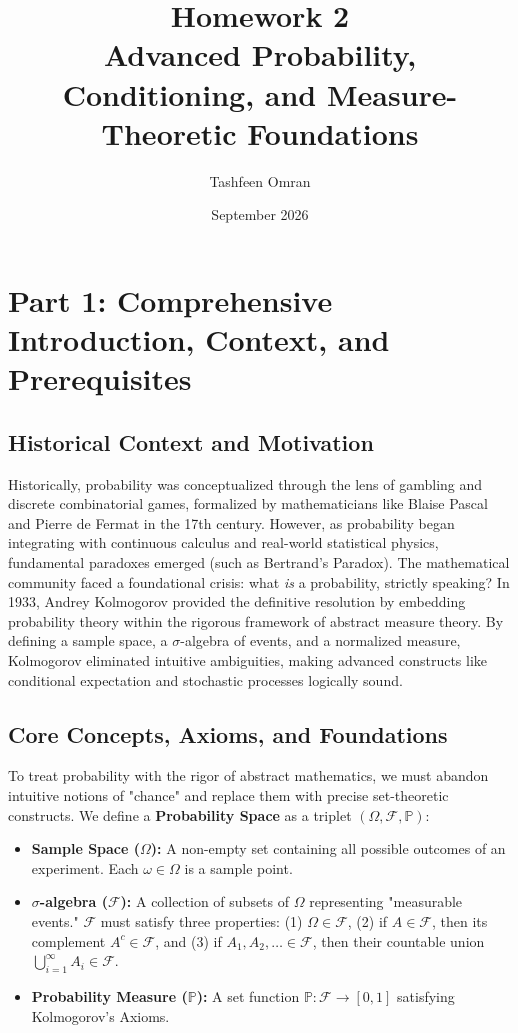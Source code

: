 \documentclass[12pt, a4paper]{article}
\title{\textbf{Homework 2 \\ Advanced Probability, Conditioning, and Measure-Theoretic Foundations}}
\author{Tashfeen Omran}
\date{September 2026}
\theoremstyle{definition}
\theoremstyle{remark}
\newcommand{\Prob}{\mathbb{P}}
\newcommand{\F}{\mathcal{F}}
\newcommand{\W}{\Omega}
\newcommand{\1}{\mathbf{1}}
\begin{document}
\maketitle
\tableofcontents
\newpage

\section{Part 1: Comprehensive Introduction, Context, and Prerequisites}

\subsection{Historical Context and Motivation}
Historically, probability was conceptualized through the lens of gambling and discrete combinatorial games, formalized by mathematicians like Blaise Pascal and Pierre de Fermat in the 17th century. However, as probability began integrating with continuous calculus and real-world statistical physics, fundamental paradoxes emerged (such as Bertrand's Paradox). The mathematical community faced a foundational crisis: what \textit{is} a probability, strictly speaking? In 1933, Andrey Kolmogorov provided the definitive resolution by embedding probability theory within the rigorous framework of abstract measure theory. By defining a sample space, a $\sigma$-algebra of events, and a normalized measure, Kolmogorov eliminated intuitive ambiguities, making advanced constructs like conditional expectation and stochastic processes logically sound. 

\subsection{Core Concepts, Axioms, and Foundations}
To treat probability with the rigor of abstract mathematics, we must abandon intuitive notions of "chance" and replace them with precise set-theoretic constructs. We define a \textbf{Probability Space} as a triplet $(\W, \F, \Prob)$:
\begin{itemize}
    \item \textbf{Sample Space ($\W$):} A non-empty set containing all possible outcomes of an experiment. Each $\omega \in \W$ is a sample point.
    \item \textbf{$\sigma$-algebra ($\F$):} A collection of subsets of $\W$ representing "measurable events." $\F$ must satisfy three properties: (1) $\W \in \F$, (2) if $A \in \F$, then its complement $A^c \in \F$, and (3) if $A_1, A_2, \dots \in \F$, then their countable union $\bigcup_{i=1}^\infty A_i \in \F$.
    \item \textbf{Probability Measure ($\Prob$):} A set function $\Prob: \F \to [0, 1]$ satisfying Kolmogorov's Axioms.
\end{itemize}
\end{document}
